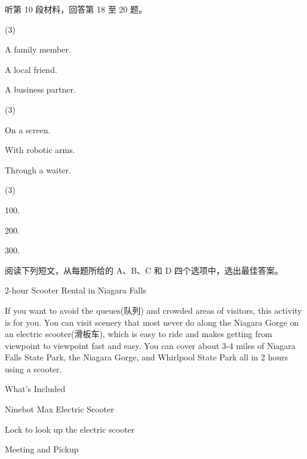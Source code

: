 \documentclass{英语试卷}
\begin{document}
\par 听第 10 段材料，回答第 18 至 20 题。\par
{}
\begin{choices}(3)
  \item A family member.
  \item A local friend.
  \item A business partner.
\end{choices}
\begin{choices}(3)
  \item On a screen.
  \item With robotic arms.
  \item Through a waiter.
\end{choices}
\begin{choices}(3)
  \item 100.
  \item 200.
  \item 300.
\end{choices}
\par 阅读下列短文，从每题所给的 A、B、C 和 D 四个选项中，选出最佳答案。\par
{}
\par 2-hour Scooter Rental in Niagara Falls\par
\par If you want to avoid the queues(队列) and crowded areas of visitors, this activity is for you. You can visit scenery that most never do along the Niagara Gorge on an electric scooter(滑板车), which is easy to ride and makes getting from viewpoint to viewpoint fast and easy. You can cover about 3-4 miles of Niagara Falls State Park, the Niagara Gorge, and Whirlpool State Park all in 2 hours using a scooter.\par
\par What's Included\par
\par Ninebot Max Electric Scooter\par
\par Lock to look up the electric scooter\par
\par Meeting and Pickup\par
\par\vspace{0.4em}
\end{document}
